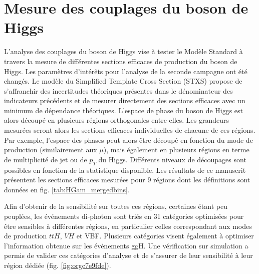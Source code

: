 \section{Mesure des couplages du boson de Higgs}

L'analyse des couplages du boson de Higgs vise à tester le Modèle Standard à travers la mesure de différentes sections efficaces de production du boson de Higgs.
Les paramètres d'intérêts pour l'analyse de la seconde campagne ont été changés.
Le modèle du  Simplified Template Cross Section (STXS) propose de s'affranchir des incertitudes théoriques présentes dans le dénominateur des indicateurs précédents et de mesurer directement des sections efficaces avec un minimum de dépendance théoriques.
L'espace de phase du boson de Higgs est alors découpé en plusieurs régions orthogonales entre elles.
Les grandeurs mesurées seront alors les sections efficaces individuelles de chacune de ces régions.
Par exemple, l'espace des phases peut alors être découpé en fonction du mode de production (similairement aux $\mu$), mais également en plusieurs régions en terme de multiplicité de jet ou de $p_T$ du Higgs.
Différents niveaux de découpages sont possibles en fonction de la statistique disponible.
Les résultats de ce manuscrit  présentent les sections efficaces mesurées pour 9 régions dont les définitions sont données en fig. \ref{tab:HGam_mergedbins}.

Afin d'obtenir de la sensibilité sur toutes ces régions, certaines étant peu peuplées, les événements di-photon sont triés en 31 catégories optimisées pour être sensibles à différentes régions, en particulier celles correspondant aux modes de production $ttH$, $VH$ et VBF.
Plusieurs catégories visent également à optimiser l'information obtenue sur les événements ggH.
Une vérification sur simulation a permis de valider ces catégories d'analyse et de s'assurer de leur sensibilité à leur région dédiée (fig. \ref{fig:orgc7e9fde}).

